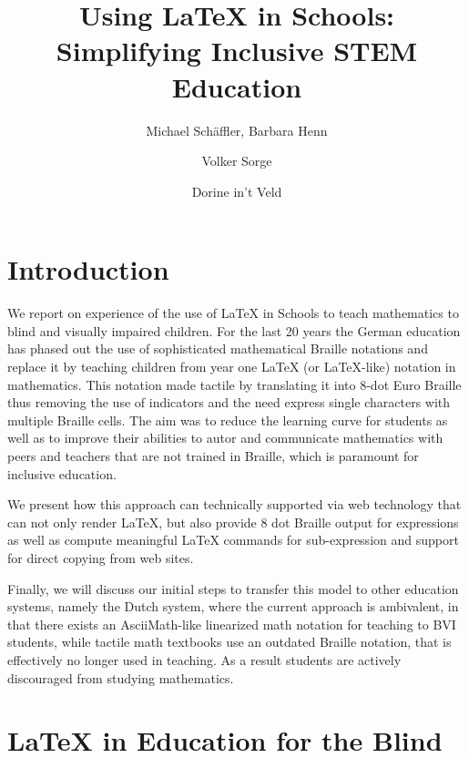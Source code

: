 \documentclass{article}
\begin{document}
\title{Using LaTeX in Schools: Simplifying Inclusive STEM Education}

\author[1]{Michael Schäffler, Barbara Henn}

\author[2]{Volker Sorge}

\author[3]{Dorine in't Veld}

\date{}
\maketitle


\section{Introduction}\label{sec:intro}

We report on experience of the use of LaTeX in Schools to teach mathematics to
blind and visually impaired children. For the last 20 years the German education
has phased out the use of sophisticated mathematical Braille notations and
replace it by teaching children from year one LaTeX (or LaTeX-like) notation in
mathematics. This notation made tactile by translating it into 8-dot Euro
Braille thus removing the use of indicators and the need express single
characters with multiple Braille cells. The aim was to reduce the learning curve
for students as well as to improve their abilities to autor and communicate
mathematics with peers and teachers that are not trained in Braille, which is
paramount for inclusive education.

We present how this approach can technically supported via web technology that
can not only render LaTeX, but also provide 8 dot Braille output for expressions
as well as compute meaningful LaTeX commands for sub-expression and support for
direct copying from web sites.

Finally, we will discuss our initial steps to transfer this model to other
education systems, namely the Dutch system, where the current approach is
ambivalent, in that there exists an AsciiMath-like linearized math notation for
teaching to BVI students, while tactile math textbooks use an outdated Braille
notation, that is effectively no longer used in teaching.  As a result students
are actively discouraged from studying mathematics.

\section{LaTeX in Education for the Blind}\label{sec:latex-in-schools}
\end{document}
